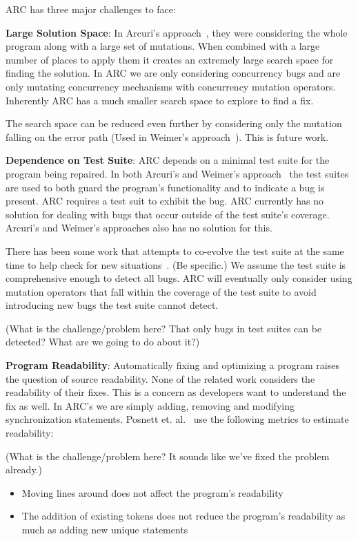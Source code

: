 \documentclass{llncs}
\begin{document}
ARC has three major challenges to face:

\textbf{Large Solution Space}: In Arcuri's approach~\cite{AY08}, they were
considering the whole program along with a large set of mutations. When
combined with a large number of places to apply them it creates an extremely
large search space for finding the solution. In ARC we are only considering
concurrency bugs and are only mutating concurrency mechanisms with concurrency
mutation operators. Inherently ARC has a much smaller search space to explore
to find a fix.

The search space can be reduced even further by considering only the mutation
falling on the error path (Used in Weimer's approach~\cite{GNFW11}). This is
future work.

\textbf{Dependence on Test Suite}: ARC depends on a minimal test suite for the
program being repaired. In both Arcuri's and Weimer's
approach~\cite{AY08,GNFW11} the test suites are used to both guard the
program's functionality and to indicate a bug is present. ARC requires a test
suit to exhibit the bug. ARC currently has no solution for dealing with bugs
that occur outside of the test suite's coverage. Arcuri's and Weimer's
approaches also has no solution for this.

There has been some work that attempts to co-evolve the test suite at the same
time to help check for new situations~\cite{WT10}. (Be specific.) We assume the
test suite is comprehensive enough to detect all bugs. ARC will eventually only
consider using mutation operators that fall within the coverage of the test
suite to avoid introducing new bugs the test suite cannot detect.

(What is the challenge/problem here? That only bugs in test suites can be
detected? What are we going to do about it?)

\textbf{Program Readability}: Automatically fixing and optimizing a program
raises the question of source readability. None of the related work considers
the readability of their fixes. This is a concern as developers want to
understand the fix as well. In ARC's we are simply adding, removing and
modifying synchronization statements. Posnett et. al.~\cite{PHD11} use the
following metrics to estimate readability:

(What is the challenge/problem here? It sounds like we've fixed the problem
already.)

\begin{itemize}
  \item Moving lines around does not affect the program's readability
  \item The addition of existing tokens does not reduce the program's
readability as much as adding new unique statements
\end{itemize}
\end{document}
